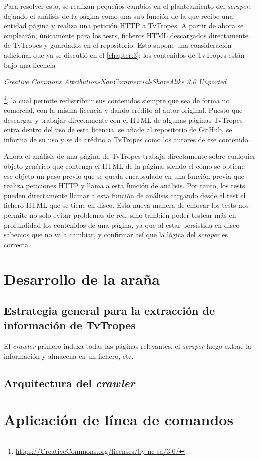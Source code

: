 Para resolver esto, se realizan pequeños cambios en el planteamiento del
\textit{scraper}, dejando el análisis de la página como una sub función de la
que recibe una entidad página y realiza una petición HTTP a TvTropes. A partir
de ahora se emplearán, únicamente para los tests, ficheros HTML descargados
directamente de TvTropes y guardados en el repositorio. Esto supone una
consideración adicional que ya se discutió en el \autoref{chapter:3}; los
contenidos de TvTropes están bajo una licencia
\begin{otherlanguage}{english}\textit{Creative Commons
Attribution-NonCommercial-ShareAlike 3.0
Unported}\end{otherlanguage}\footnote{\url{https://CreativeCommons.org/licenses/by-nc-sa/3.0/}},
la cual permite redistribuir sus contenidos siempre que sea de forma no
comercial, con la misma licencia y dando crédito al autor original.
Puesto que descargar y trabajar directamente con el HTML de algunas páginas TvTropes
entra dentro del uso de esta licencia, se añade al repositorio de GitHub, se
informa de su uso y se da crédito a TvTropes como los autores de ese contenido.
 
Ahora el análisis de una página de TvTropes trabaja directamente sobre cualquier
objeto genérico que contenga el HTML de la página, siendo el cómo se obtiene ese
objeto un paso previo que se queda encapsulado en una función previa que realiza
peticiones HTTP y llama a esta función de análisis. Por tanto, los tests pueden
directamente llamar a esta función de análisis cargando desde el test el fichero
HTML que se tiene en disco. Esta nueva manera de enfocar los tests nos permite
no solo evitar problemas de red, sino también poder testear más en profundidad
los contenidos de una página, ya que al estar persistida en disco sabemos que no
va a cambiar, y confirmar así que la lógica del \textit{scraper} es correcta.

\section{Desarrollo de la araña}

\subsection{Estrategia general para la extracción de información de TvTropes}
El \textit{crawler} primero indexa todas las páginas relevantes, el
\textit{scraper} luego extrae la información y almacena en un fichero, etc.

\subsection{Arquitectura del \textit{crawler}}

\section{Aplicación de línea de comandos}